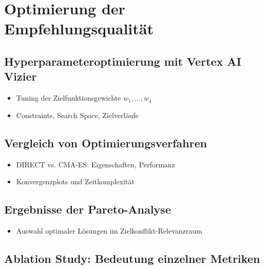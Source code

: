 \section{Optimierung der Empfehlungsqualität}

\subsection{Hyperparameteroptimierung mit Vertex AI Vizier}
\begin{itemize}
    \item Tuning der Zielfunktionsgewichte $w_1, \ldots, w_4$
    \item Constraints, Search Space, Zielverläufe
\end{itemize}

\subsection{Vergleich von Optimierungsverfahren}
\begin{itemize}
    \item DIRECT vs. CMA-ES: Eigenschaften, Performanz
    \item Konvergenzplots und Zeitkomplexität
\end{itemize}

\subsection{Ergebnisse der Pareto-Analyse}
\begin{itemize}
    \item Auswahl optimaler Lösungen im Zielkonflikt-Relevanzraum
\end{itemize}

\subsection{Ablation Study: Bedeutung einzelner Metriken}